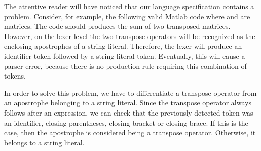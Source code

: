 The attentive reader will have noticed that our language specification contains a problem.
Consider, for example, the following valid Matlab code  where  and  are matrices.
The code should produces the sum of two transposed matrices.
However, on the lexer level the two transpose operators will be recognized as the enclosing apostrophes of a string literal.
Therefore, the lexer will produce an identifier token followed by a string literal token.
Eventually, this will cause a parser error, because there is no production rule requiring this combination of tokens.

In order to solve this problem, we have to differentiate a transpose operator from an apostrophe belonging to a string literal.
Since the transpose operator always follows after an expression, we can check that the previously detected token was an identifier, closing parentheses, closing bracket or closing brace.
If this is the case, then the apostrophe is considered being a transpose operator.
Otherwise, it belongs to a string literal.